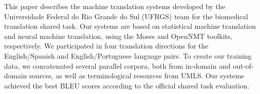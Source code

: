 This paper describes the machine translation systems developed by the Universidade Federal do Rio Grande do Sul (UFRGS) team for the biomedical translation shared task. Our systems are based on statistical machine translation and neural machine translation, using the Moses and OpenNMT toolkits, respectively. We participated in four translation directions for the English/Spanish and English/Portuguese language pairs. To create our training data, we concatenated several parallel corpora, both from in-domain and out-of-domain sources, as well as terminological resources from UMLS. Our systems achieved the best BLEU scores according to the official shared task evaluation.
